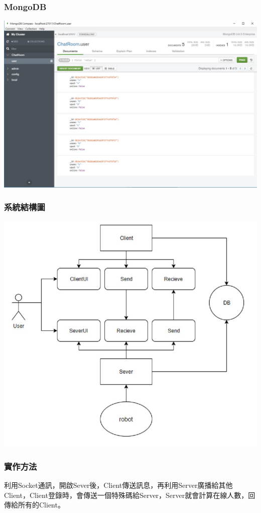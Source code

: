 \documentclass[utf8x]{beamer}
\begin{document}
\begin{frame}[t]
\frametitle{\LARGE MongoDB} %
\hspace{0.5cm} \includegraphics[scale=0.3]{mongodb}
\end{frame}
\begin{frame}[t]
\frametitle{\huge 系統結構圖} %
\hspace{3em}  \includegraphics[scale=0.35]{sad}
\end{frame}

\begin{frame}[t]
\frametitle{\LARGE 實作方法} %
\vspace{2em}
\hspace{2em} \Large 利用Socket通訊，開啟Sever後，Client傳送訊息，再利用Server廣播給其他Client，Client登錄時，會傳送一個特殊碼給Server，Server就會計算在線人數，回傳給所有的Client。
\end{frame}
\end{document}

